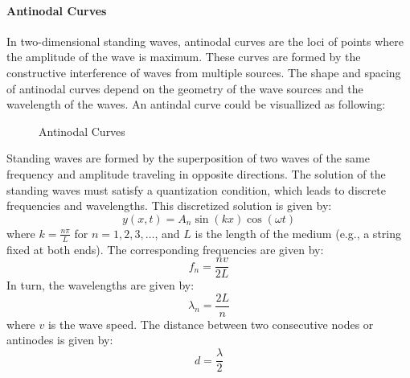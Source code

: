 \documentclass[11pt]{report}
\begin{document}
\paragraph{Antinodal Curves} In two-dimensional standing waves, antinodal curves are the loci of points where the amplitude of the wave is maximum. These curves are formed by the constructive interference of waves from multiple sources. The shape and spacing of antinodal curves depend on the geometry of the wave sources and the wavelength of the waves. An antindal curve could be visuallized as following:
\begin{figure}[h!]
    \centering
    \caption{Antinodal Curves}
    \label{fig:antinodal_curves}
\end{figure}


\begin{definition}
    Standing waves are formed by the superposition of two waves of the same frequency and amplitude traveling in opposite directions. The solution of the standing waves must satisfy a quantization condition, which leads to discrete frequencies and wavelengths. This discretized solution is given by:
    \begin{equation}\label{eq:standing_wave}
        y(x,t) = A_n \sin(kx) \cos(\omega t)
    \end{equation}
    where \( k = \frac{n\pi}{L} \) for \( n = 1, 2, 3, \ldots \), and \( L \) is the length of the medium (e.g., a string fixed at both ends). The corresponding frequencies are given by: 
    $$
        f_n = \frac{n v}{2L}
    $$
    In turn, the wavelengths are given by:
    $$
        \lambda_n = \frac{2L}{n}
    $$
    where \( v \) is the wave speed. The distance between two consecutive nodes or antinodes is given by:
    $$
        d = \frac{\lambda}{2}
    $$
    
\end{definition}
\end{document}
